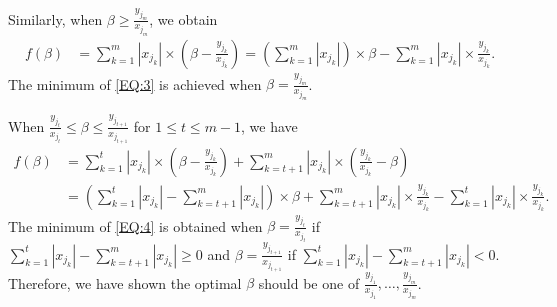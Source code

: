 \documentclass[12pt]{article}
\begin{document}
Similarly, when $\beta \geq \frac{y_{{j}_m}}{x_{{j}_m}}$, we obtain
\begin{align}
\label{EQ:3}
f(\beta) 
& = \sum_{k = 1}^m \left|x_{{j}_k}\right|\times\left(\beta - \frac{y_{{j}_k}}{x_{{j}_k}}\right) = \left(\sum_{k = 1}^m \left|x_{{j}_k}\right|\right) \times \beta - \sum_{k = 1}^m \left|x_{{j}_k}\right|\times\frac{y_{{j}_k}}{x_{{j}_k}}.
\end{align}
The minimum of \eqref{EQ:3} is achieved when $\beta = \frac{y_{{j}_m}}{x_{{j}_m}}$. 

When $\frac{y_{{j}_t}}{x_{{j}_t}} \leq \beta \leq \frac{y_{{j}_{t + 1}}}{x_{{j}_{t + 1}}} $ for $1 \leq t \leq m - 1$, we have
\begin{align}
\label{EQ:4}
f(\beta) 
& = \sum_{k = 1}^t \left|x_{{j}_k}\right|\times\left(\beta - \frac{y_{{j}_k}}{x_{{j}_k}}\right) 
 + \sum_{k = t + 1}^m \left|x_{{j}_k}\right|\times\left(\frac{y_{{j}_k}}{x_{{j}_k}} - \beta\right)
 \nonumber\\
& = \left(\sum_{k = 1}^t \left|x_{{j}_k}\right| - \sum_{k = t + 1}^m \left|x_{{j}_k}\right|\right) \times \beta + \sum_{k = t + 1}^m \left|x_{{j}_k}\right|\times\frac{y_{{j}_k}}{x_{{j}_k}} - \sum_{k = 1}^t \left|x_{{j}_k}\right|\times\frac{y_{{j}_k}}{x_{{j}_k}}.
\end{align}
The minimum of \eqref{EQ:4} is obtained when $\beta = \frac{y_{{j}_t}}{x_{{j}_t}}$ if $\sum_{k = 1}^t \left|x_{{j}_k}\right| - \sum_{k = t + 1}^m \left|x_{{j}_k}\right| \geq 0$ and $\beta = \frac{y_{{j}_{t + 1}}}{x_{{j}_{t + 1}}}$ if $\sum_{k = 1}^t \left|x_{{j}_k}\right| - \sum_{k = t + 1}^m \left|x_{{j}_k}\right| < 0$. Therefore, we have shown the optimal $\beta$ should be one of $\frac{y_{{j}_1}}{x_{{j}_1}}, \ldots, \frac{y_{{j}_m}}{x_{{j}_m}}$.
\end{document}
